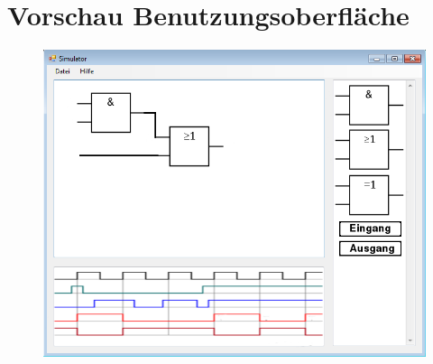 
\section{Vorschau Benutzungsoberfläche}

\begin{figure}[!htbp]
 	\centering
	\includegraphics[width=15cm]{gui.png}
\end{figure}
